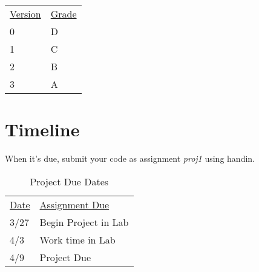 \documentclass[]{tufte-handout}
\begin{document}
\begin{tabular}{@{}ll@{}}
\underline{Version} & \underline{Grade} \\
0 & D\\
1 & C\\
2 & B\\
3 & A\\
\end{tabular}


\newpage

\section{Timeline}

When it's due, submit your code as assignment \textit{proj1} using handin.
\begin{table}[!htpb]
  \begin{tabular}{ll}
    \underline{Date} & \underline{Assignment Due} \\
      3/27 & Begin Project in Lab \\
      4/3  & Work time in Lab \\
      4/9 & Project Due
  \end{tabular}
  \caption{Project Due Dates}\label{tab:duedates}
\end{table}
\end{document}
